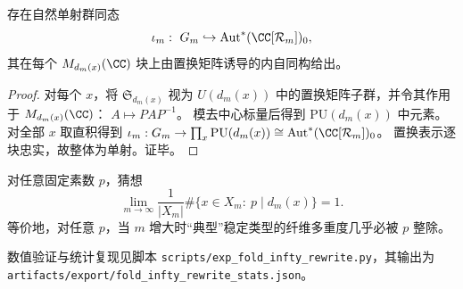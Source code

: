 \begin{proposition}[离散规范群到连续规范群的自然嵌入]\label{prop:fold-discrete-to-continuous-gauge-embedding}
存在自然单射群同态
\[
\iota_m:\ G_m\hookrightarrow \mathrm{Aut}^{\ast}(\CC[\mathcal{R}_m])_0,
\]
其在每个 \(M_{d_m(x)}(\CC)\) 块上由置换矩阵诱导的内自同构给出。
\end{proposition}
\begin{proof}
对每个 \(x\)，将 \(\mathfrak S_{d_m(x)}\) 视为 \(U(d_m(x))\) 中的置换矩阵子群，并令其作用于 \(M_{d_m(x)}(\CC)\)：
\(
A\mapsto PAP^{-1}
\)。
模去中心标量后得到 \(\mathrm{PU}(d_m(x))\) 中元素。
对全部 \(x\) 取直积得到 \(\iota_m:G_m\to \prod_x\mathrm{PU}(d_m(x))\cong \mathrm{Aut}^{\ast}(\CC[\mathcal{R}_m])_0\)。
置换表示逐块忠实，故整体为单射。证毕。
\end{proof}

\begin{conjecture}[素数整除在典型纤维中的几乎必然性]\label{conj:fold-typical-fiber-divisible-by-p}
对任意固定素数 \(p\)，猜想
\[
\lim_{m\to\infty}\frac1{|X_m|}\#\{x\in X_m:\ p\mid d_m(x)\}=1.
\]
等价地，对任意 \(p\)，当 \(m\) 增大时“典型”稳定类型的纤维多重度几乎必被 \(p\) 整除。
\end{conjecture}

数值验证与统计复现见脚本 \texttt{scripts/exp\_fold\_infty\_rewrite.py}，其输出为
\texttt{artifacts/export/fold\_infty\_rewrite\_stats.json}。
